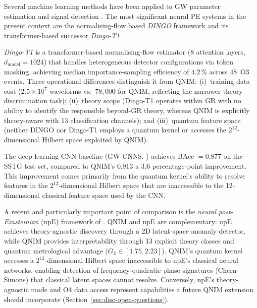 \documentclass[11pt,a4paper, english]{book}
\theoremstyle{plain}
\theoremstyle{definition}
\numberwithin{equation}{chapter}
\numberwithin{figure}{chapter}
\numberwithin{table}{chapter}
\begin{document}
Several machine learning methods have been applied to GW parameter
estimation and signal detection
\cite{George_2018, Gabbard_2019, Dax_2021_rapid, Kofler_2025_DingoT1}.
The most significant neural PE systems in the present context are the
normalising-flow based \emph{DINGO} framework \cite{Dax_2021_rapid} and
its transformer-based successor \emph{Dingo-T1} \cite{Kofler_2025_DingoT1}.

\emph{Dingo-T1} \cite{Kofler_2025_DingoT1} is a transformer-based
normalising-flow estimator (8 attention layers, $d_\mathrm{model}=1024$)
that handles heterogeneous detector configurations via token masking,
achieving median importance-sampling efficiency of $4.2\,\%$ across 48~O3
events. Three operational differences distinguish it from QNIM: (i)~training
data cost ($2.5\times10^7$ waveforms vs.\ $78{,}000$ for QNIM, reflecting the
narrower theory-discrimination task); (ii)~theory scope (Dingo-T1 operates
within GR with no ability to identify the responsible beyond-GR theory, whereas
QNIM is explicitly theory-aware with 13 classification channels); and
(iii)~quantum feature space (neither DINGO nor Dingo-T1 employs a quantum
kernel or accesses the $2^{12}$-dimensional Hilbert space exploited by QNIM).

The deep learning CNN baseline (GW-CNNS, \cite{George_2018}) achieves
BAcc $= 0.877$ on the SSTG test set, compared to QNIM's $0.913$  a
$3.6$ percentage-point improvement.  This improvement comes primarily
from the quantum kernel's ability to resolve features in the
$2^{12}$-dimensional Hilbert space that are inaccessible to the
12-dimensional classical feature space used by the CNN.

A recent and particularly important point of comparison is the
\emph{neural post-Einsteinian} (npE) framework of
.  QNIM and npE are complementary: npE achieves
theory-agnostic discovery through a 2D latent-space anomaly detector,
while QNIM provides interpretability through 13 explicit theory classes
and quantum metrological advantage ($G_k \in [1.75, 2.23]$). QNIM's
quantum kernel accesses a $2^{12}$-dimensional Hilbert space
inaccessible to npE's classical neural networks, enabling detection of
frequency-quadratic phase signatures (Chern-Simons) that classical
latent spaces cannot resolve. Conversely, npE's theory-agnostic mode and
O4 data access represent capabilities a future QNIM extension should
incorporate (Section~\ref{sec:disc-open-questions}).
\end{document}
